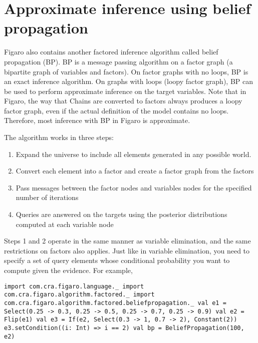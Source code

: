 \section{Approximate inference using belief propagation}

Figaro also contains another factored inference algorithm called belief propagation (BP). BP is a message passing algorithm on a factor graph (a bipartite graph of variables and factors). On factor graphs with no loops, BP is an exact inference algorithm. On graphs with loops (loopy factor graph), BP can be used to perform approximate inference on the target variables. Note that in Figaro, the way that Chains are converted to factors always produces a loopy factor graph, even if the actual definition of the model contains no loops. Therefore, most inference with BP in Figaro is approximate.

The algorithm works in three steps:
\begin{enumerate}
\item Expand the universe to include all elements generated in any possible world.
\item Convert each element into a factor and create a factor graph from the factors
\item Pass messages between the factor nodes and variables nodes for the specified number of iterations
\item Queries are answered on the targets using the posterior distributions computed at each variable node
\end{enumerate}

Steps 1 and 2 operate in the same manner as variable elimination, and the same restrictions on factors also applies. Just like in variable elimination, you need to specify a set of query elements whose conditional probability you want to compute given the evidence. For example,

\begin{flushleft}
\texttt{import com.cra.figaro.language.\_
\newline import com.cra.figaro.algorithm.factored.\_
\newline import com.cra.figaro.algorithm.factored.beliefpropagation.\_
\newline 
\newline val e1 = Select(0.25 -> 0.3, 0.25 -> 0.5, 0.25 -> 0.7, 0.25 -> 0.9)
\newline val e2 = Flip(e1)
\newline val e3 = If(e2, Select(0.3 -> 1, 0.7 -> 2), Constant(2))
\newline e3.setCondition((i: Int) => i == 2)
\newline 
\newline val bp = BeliefPropagation(100, e2)}
\end{flushleft}

